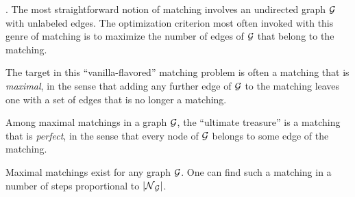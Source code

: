 \noindent {}
\bigskip

.
The most straightforward notion of matching involves an undirected
graph $\mbox{$\cal G$}$ with unlabeled edges.  The optimization criterion most
often invoked with this genre of matching is to maximize the number of
edges of $\mbox{$\cal G$}$ that belong to the matching.

The target in this ``vanilla-flavored'' matching problem is often a
matching that is {\em maximal}, 
 in the sense that
adding any further edge of $\mbox{$\cal G$}$ to the matching leaves one with a set
of edges that is no longer a matching.

Among maximal matchings in a graph $\mbox{$\cal G$}$, the ``ultimate treasure'' is
a matching that is {\it perfect},  in
the sense that every node of $\mbox{$\cal G$}$ belongs to some edge of the
matching.

\begin{prop}
\label{thm:max-matching}
Maximal matchings exist for any graph $\mbox{$\cal G$}$.  One can find such a
matching in a number of steps proportional to $|\mbox{$\cal N$}_{\mbox{{\scriptsize $\cal G$}}}|$.
\end{prop}

